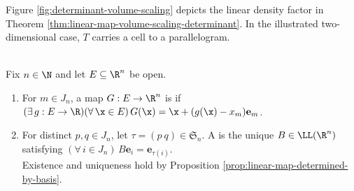 Figure \ref{fig:determinant-volume-scaling} depicts the linear density factor in Theorem \ref{thm:linear-map-volume-scaling-determinant}. In the illustrated two-dimensional case, $T$ carries a cell to a parallelogram.
\begin{illustrationfigure}[H]
  \centering
  
  \caption{The image parallelogram has the determinant density factor $\abs{\det T}$.}
  \label{fig:determinant-volume-scaling}
\end{illustrationfigure}

\begin{definition} \label{def:primitive-mapping-and-flip} \\
Fix $n\in\N$ and let $E\subseteq\R^n$ be open.
\begin{enumerate}[label=(\roman*)]
\setlength{\itemsep}{0pt}
\item For $m\in J_n$, a map $G:E\to\R^n$ is  if $(\exists\,g:E\to\R)(\forall\,\x\in E)\,G(\x)=\x+(g(\x)-x_m)\mathbf e_m$.
\item For distinct $p,q\in J_n$, let $\tau=(p\ q)\in\mathfrak S_n$. A  is the unique $B\in\LL(\R^n)$ satisfying $(\forall\,i\in J_n)\,B\mathbf e_i=\mathbf e_{\tau(i)}$.\\
Existence and uniqueness hold by Proposition \ref{prop:linear-map-determined-by-basis}.
\end{enumerate}
\end{definition}

